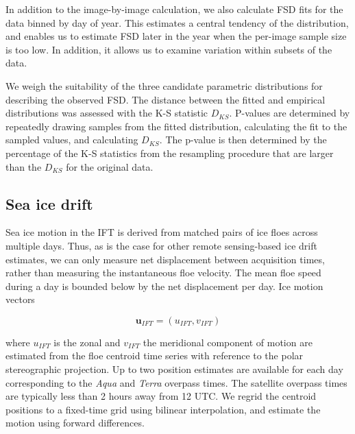 \documentclass[review, jog]{igs}
\begin{document}
In addition to the image-by-image calculation, we also calculate FSD fits for the data binned by day of year. 
This estimates a central tendency of the distribution, and enables us to estimate FSD later in the year when the per-image sample size is too low.
In addition, it allows us to examine variation within subsets of the data.

We weigh the suitability of the three candidate parametric distributions for describing the observed FSD.
The distance between the fitted and empirical distributions was assessed with the K-S statistic $D_{KS}$. 
P-values are determined by repeatedly drawing samples from the fitted distribution, calculating the fit to the sampled values, and calculating $D_{KS}$.
The p-value is then determined by the percentage of the K-S statistics from the resampling procedure that are larger than the $D_{KS}$ for the original data. 

\subsection{Sea ice drift}
Sea ice motion in the IFT is derived from matched pairs of ice floes across multiple days.
Thus, as is the case for other remote sensing-based ice drift estimates, we can only measure net displacement between acquisition times, rather than measuring the instantaneous floe velocity. The mean floe speed during a day is bounded below by the net displacement per day.
Ice motion vectors 
\begin{linenomath*}
    \begin{equation}
        \mathbf{u}_{IFT} = (u_{IFT}, v_{IFT})       
    \end{equation}
\end{linenomath*}
where $u_{IFT}$ is the zonal and $v_{IFT}$ the meridional component of motion are estimated from the floe centroid time series with reference to the polar stereographic projection.
Up to two position estimates are available for each day corresponding to the \textit{Aqua} and \textit{Terra} overpass times.
The satellite overpass times are typically less than 2 hours away from 12 UTC.
We regrid the centroid positions to a fixed-time grid using bilinear interpolation, and estimate the motion using forward differences.
\end{document}
